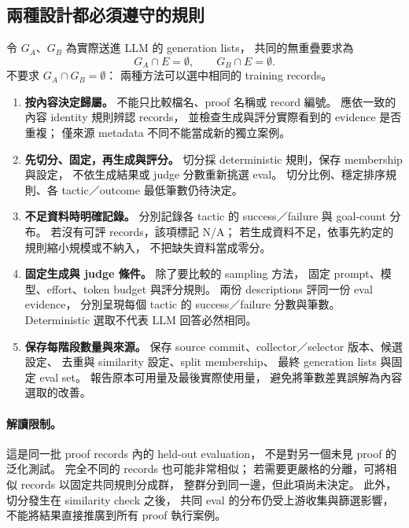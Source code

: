 \subsection{兩種設計都必須遵守的規則}

令 $G_A$、$G_B$ 為實際送進 LLM 的 generation lists，\allowbreak
共同的無重疊要求為
\[
  G_A\cap E=\emptyset,\qquad G_B\cap E=\emptyset.
\]
不要求 $G_A\cap G_B=\emptyset$：\allowbreak
兩種方法可以選中相同的 training records。

\begin{enumerate}
  \item \textbf{按內容決定歸屬。}
        不能只比較檔名、proof 名稱或 record 編號。
        應依一致的內容 identity 規則辨認 records，\allowbreak
        並檢查生成與評分實際看到的 evidence 是否重複；\allowbreak
        僅來源 metadata 不同不能當成新的獨立案例。
  \item \textbf{先切分、固定，再生成與評分。}
        切分採 deterministic 規則，\allowbreak 保存 membership 與設定，\allowbreak
        不依生成結果或 judge 分數重新挑選 eval。
        切分比例、穩定排序規則、各 tactic／outcome 最低筆數仍待決定。
  \item \textbf{不足資料時明確記錄。}
        分別記錄各 tactic 的 success／failure 與 goal-count 分布。
        若沒有可評 records，\allowbreak 該項標記 N/A；\allowbreak
        若生成資料不足，\allowbreak 依事先約定的規則縮小規模或不納入，\allowbreak
        不把缺失資料當成零分。
  \item \textbf{固定生成與 judge 條件。}
        除了要比較的 sampling 方法，\allowbreak
        固定 prompt、模型、effort、token budget 與評分規則。
        兩份 descriptions 評同一份 eval evidence，\allowbreak
        分別呈現每個 tactic 的 success／failure 分數與筆數。
        Deterministic 選取不代表 LLM 回答必然相同。
  \item \textbf{保存每階段數量與來源。}
        保存 source commit、collector／selector 版本、候選設定、\allowbreak
        去重與 similarity 設定、split membership、\allowbreak
        最終 generation lists 與固定 eval set。
        報告原本可用量及最後實際使用量，\allowbreak
        避免將筆數差異誤解為內容選取的改善。
\end{enumerate}

\paragraph{解讀限制。}
這是同一批 proof records 內的 held-out evaluation，\allowbreak
不是對另一個未見 proof 的泛化測試。
完全不同的 records 也可能非常相似；\allowbreak
若需要更嚴格的分離，\allowbreak 可將相似 records 以固定共同規則分成群，\allowbreak
整群分到同一邊，\allowbreak 但此項尚未決定。
此外，切分發生在 similarity check 之後，\allowbreak
共同 eval 的分布仍受上游收集與篩選影響，\allowbreak
不能將結果直接推廣到所有 proof 執行案例。
